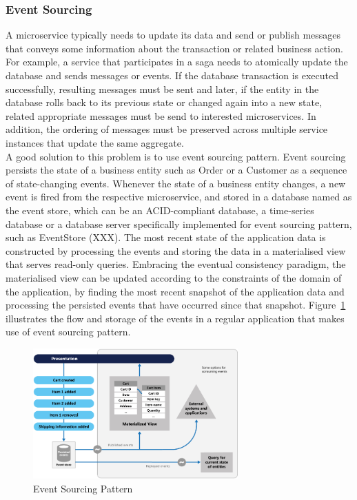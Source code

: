 \documentclass{Configuration_Files/PoliMi3i_thesis}
\begin{document}
\subsubsection{Event Sourcing}
\label{subsubsec:event_sourcing}

A microservice typically needs to update its data and send or publish messages that conveys some information about the transaction or related business action.
For example, a service that participates in a saga needs to atomically update the database and sends messages or events.
If the database transaction is executed successfully, resulting messages must be sent and later, if the entity in the database rolls back to its previous state or changed again into a new state, related appropriate messages must be send to interested microservices.
In addition, the  ordering of messages must be preserved across multiple service instances that update the same aggregate.
\\
A good solution to this problem is to use event sourcing pattern.
Event sourcing persists the state of a business entity such as Order or a Customer as a sequence of state-changing events.
Whenever the state of a business entity changes, a new event is fired from the respective microservice, and stored in a database named as the event store, which can be an ACID-compliant database, a time-series database or a database server specifically implemented for event sourcing pattern, such as EventStore (XXX).
The most recent state of the application data is constructed by processing the events and storing the data in a materialised view that serves read-only queries.
Embracing the eventual consistency paradigm, the materialised view can be updated according to the constraints of the domain of the application, by finding the most recent snapshot of the application data and processing the persisted events that have occurred since that snapshot. Figure~\ref{fig:event_sourcing} illustrates the flow and storage of the events in a regular application that makes use of event sourcing pattern.

\begin{figure}[H]
\centering
\includegraphics[width=0.70\textwidth]{myImages/event-sourcing.png}
\caption{Event Sourcing Pattern}
\label{fig:event_sourcing}
\end{figure}
\end{document}
